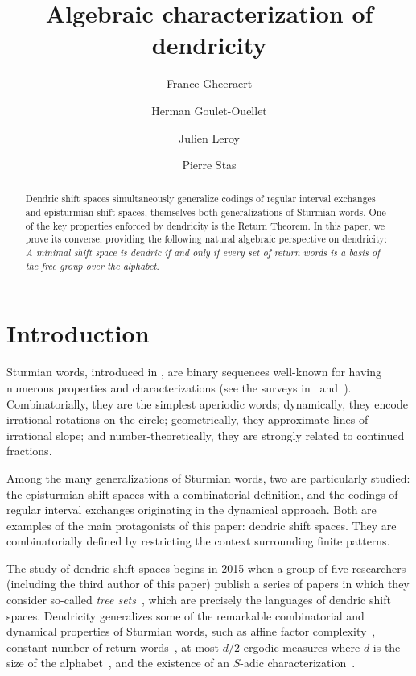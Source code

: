 \documentclass{amsart}
\theoremstyle{plain}
\theoremstyle{definition}
\theoremstyle{remark}
\begin{document}
\title{Algebraic characterization of dendricity}

\author[F. Gheeraert]{France Gheeraert}
\author[H. Goulet-Ouellet]{Herman Goulet-Ouellet}
\author[J. Leroy]{Julien Leroy}
\author[P. Stas]{Pierre Stas}

\begin{abstract}
    Dendric shift spaces simultaneously generalize codings of regular interval exchanges and episturmian shift spaces, themselves both generalizations of Sturmian words. One of the key properties enforced by dendricity is the Return Theorem. In this paper, we prove its converse, providing the following natural algebraic perspective on dendricity: \emph{A minimal shift space is dendric if and only if every set of return words is a basis of the free group over the alphabet}.
\end{abstract}

\maketitle

\section{Introduction}
\label{s:intro}

Sturmian words, introduced in \cite{Morse1940}, are binary sequences well-known for having numerous properties and characterizations (see the surveys in~\cite{book/Lothaire2002} and~\cite{book/Fogg2002}). Combinatorially, they are the simplest aperiodic words; dynamically, they encode irrational rotations on the circle; geometrically, they approximate lines of irrational slope; and number-theoretically, they are strongly related to continued fractions.

Among the many generalizations of Sturmian words, two are particularly studied: the episturmian shift spaces \cite{Glen2009} with a combinatorial definition, and the codings of regular interval exchanges \cite{Ferenczi2013} originating in the dynamical approach. Both are examples of the main protagonists of this paper: dendric shift spaces. They are combinatorially defined by restricting the context surrounding finite patterns. 

The study of dendric shift spaces begins in 2015 when a group of five researchers (including the third author of this paper) publish a series of papers in which they consider so-called \emph{tree sets}~\cite{Berthe2015,Berthe2015a,Berthe2015c}, which are precisely the languages of dendric shift spaces.
Dendricity generalizes some of the remarkable combinatorial and dynamical properties of Sturmian words, such as affine factor complexity~\cite{Berthe2015}, constant number of return words~\cite{Berthe2015}, at most $d/2$ ergodic measures where $d$ is the size of the alphabet~\cite{Damron2020}, and the existence of an $S$-adic characterization~\cite{pre/Gheeraert2022}.
\end{document}
